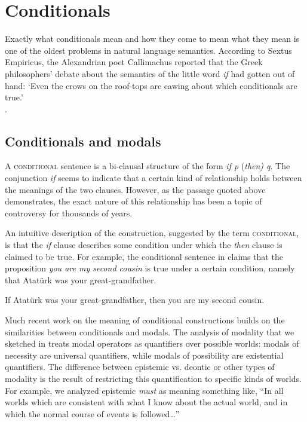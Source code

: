 \chapter{Conditionals}\label{sec:19}

\begin{flushright} 
\parbox{.7\textwidth}{
\footnotesize %
Exactly what conditionals mean and how they come to mean what they mean is one of the oldest problems in natural language semantics. According to Sextus Empiricus, the Alexandrian poet Callimachus reported that the Greek philosophers’ debate about the semantics of the little word \textit{if} had gotten out of hand: ‘Even the crows on the roof-tops are cawing about which conditionals are true.’\hfill \\ \citep{vonFintel2011}.  %
}\end{flushright}

\section{Conditionals and modals}\label{sec:19.1}

A \textsc{conditional} sentence is a bi-clausal structure of the form \textit{if p} (\textit{then) q}. The conjunction \textit{if} seems to indicate that a certain kind of relationship holds between the meanings of the two clauses. However, as the passage quoted above demonstrates, the exact nature of this relationship has been a topic of controversy for thousands of years.



An intuitive description of the construction, suggested by the term \textsc{conditional}, is that the \textit{if} clause describes some condition under which the \textit{then} clause is claimed to be true. For example, the conditional sentence in  claims that the proposition \textit{you are my second cousin} is true under a certain condition, namely that Atatürk was your great-grandfather.


\ea \label{ex:19.1}
If Atatürk was your great-grandfather, then you are my second cousin.
\z


Much recent work on the meaning of conditional constructions builds on the similarities between conditionals and modals. The analysis of modality that we sketched in  treats modal operators as quantifiers over possible worlds: modals of necessity are universal quantifiers, while modals of possibility are existential quantifiers. The difference between epistemic vs. deontic or other types of modality is the result of restricting this quantification to specific kinds of worlds. For example, we analyzed epistemic \textit{must} as meaning something like, “In all worlds which are consistent with what I know about the actual world, and in which the normal course of events is followed…”



